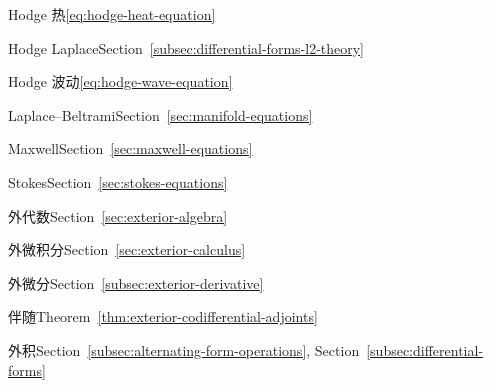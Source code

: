 \begin{theindex}
\subitem {}\label{index:equation-hodge-heat}{Hodge 热}\quad \eqref{eq:hodge-heat-equation}

\subitem {}\label{index:equation-hodge-laplace}{Hodge Laplace}\quad Section~\ref{subsec:differential-forms-l2-theory}

\subitem {}\label{index:equation-hodge-wave}{Hodge 波动}\quad \eqref{eq:hodge-wave-equation}

\subitem {}\label{index:equation-laplace-beltrami}{Laplace–Beltrami}\quad Section~\ref{sec:manifold-equations}

\subitem {}\label{index:equation-maxwell-s}{Maxwell}\quad Section~\ref{sec:maxwell-equations}

\subitem {}\label{index:equation-stokes}{Stokes}\quad Section~\ref{sec:stokes-equations}

\item {}\label{index:exterior-algebra}{外代数}\quad Section~\ref{sec:exterior-algebra}

\item {}\label{index:exterior-calculus}{外微积分}\quad Section~\ref{sec:exterior-calculus}

\item {}\label{index:exterior-derivative}{外微分}\quad Section~\ref{subsec:exterior-derivative}

\subitem {}\label{index:exterior-derivative-adjoint-of}{伴随}\quad Theorem~\ref{thm:exterior-codifferential-adjoints}

\item {}\label{index:exterior-product}{外积}\quad Section~\ref{subsec:alternating-form-operations}, Section~\ref{subsec:differential-forms}


\end{theindex}
